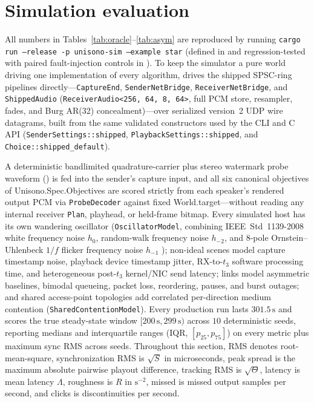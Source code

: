 \documentclass[11pt,a4paper]{article}
\DeclareRobustCommand{\lean}[1]{{\ttfamily\def\_{\textunderscore\allowbreak}#1}}
\theoremstyle{definition}
\begin{document}
\section{Simulation evaluation}
\label{sec:sim}

All numbers in Tables~\ref{tab:oracle}--\ref{tab:asym} are reproduced by
running \texttt{cargo run --release -p unisono-sim --example star} (defined in
 and regression-tested with paired
fault-injection controls in ). To keep
the simulator a pure world driving one implementation of every algorithm,
 drives the shipped
 SPSC-ring pipelines directly—\texttt{CaptureEnd},
\texttt{SenderNetBridge}, \texttt{ReceiverNetBridge}, and
\texttt{ShippedAudio} (\texttt{ReceiverAudio<256, 64, 8, 64>}, full PCM store,
resampler, fades, and Burg AR(32) concealment)—over serialized version~2 UDP
wire datagrams, built from the same validated constructors used by the CLI and
C API (\texttt{SenderSettings::shipped}, \texttt{PlaybackSettings::shipped},
and \texttt{Choice::shipped\_default}).

A deterministic bandlimited quadrature-carrier plus stereo watermark probe
waveform () is fed into the sender's
capture input, and all six canonical objectives of
\lean{Unisono.Spec.Objectives} are scored strictly from each speaker's rendered
output PCM via \texttt{ProbeDecoder} against fixed \lean{World.target}—without
reading any internal receiver \texttt{Plan}, playhead, or held-frame bitmap.
Every simulated host has its own wandering oscillator (\texttt{OscillatorModel},
combining IEEE~Std~1139-2008 white frequency noise $h_0$, random-walk frequency
noise $h_{-2}$, and 8-pole Ornstein--Uhlenbeck $1/f$ flicker frequency noise
$h_{-1}$ \cite{barnes1971,ieee1139}); non-ideal scenes model capture timestamp
noise, playback device timestamp jitter, RX-to-$t_3$ software processing time,
and heterogeneous post-$t_3$ kernel/NIC send latency; links model asymmetric
baselines, bimodal queueing, packet loss, reordering, pauses, and burst
outages; and shared access-point topologies add correlated per-direction medium
contention (\texttt{SharedContentionModel}). Every production run lasts
$301.5\,\text{s}$ and scores the true steady-state window
$[200\,\text{s}, 299\,\text{s})$ across $10$ deterministic seeds, reporting
medians and interquartile ranges (IQR, $[p_{25}, p_{75}]$) on every metric plus
maximum sync RMS across seeds. Throughout this section, RMS denotes
root-mean-square, synchronization RMS is $\sqrt{S}$ in microseconds, peak
spread is the maximum absolute pairwise playout difference, tracking RMS is
$\sqrt{\Theta}$, latency is mean latency $\Lambda$, roughness is $R$ in
$\text{s}^{-2}$, missed is missed output samples per second, and clicks is
discontinuities per second.
\end{document}
